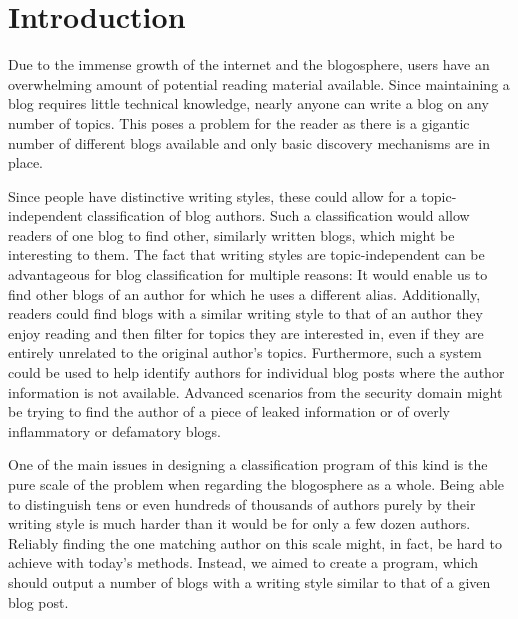 
\section{Introduction}
\label{sec:introduction}

Due to the immense growth of the internet and the blogosphere, users have an overwhelming amount of potential reading material available.
Since maintaining a blog requires little technical knowledge, nearly anyone can write a blog on any number of topics.
This poses a problem for the reader as there is a gigantic number of different blogs available and only basic discovery mechanisms are in place.


Since people have distinctive writing styles, these could allow for a topic-independent classification of blog authors.
Such a classification would allow readers of one blog to find other, similarly written blogs, which might be interesting to them.
The fact that writing styles are topic-independent can be advantageous for blog classification for multiple reasons: It would enable us to find other blogs of an author for which he uses a different alias.
Additionally, readers could find blogs with a similar writing style to that of an author they enjoy reading and then filter for topics they are interested in, even if they are entirely unrelated to the original author's topics.
Furthermore, such a system could be used to help identify authors for individual blog posts where the author information is not available.
Advanced scenarios from the security domain might be trying to find the author of a piece of leaked information or of overly inflammatory or defamatory blogs.


One of the main issues in designing a classification program of this kind is the pure scale of the problem when regarding the blogosphere as a whole.
Being able to distinguish tens or even hundreds of thousands of authors purely by their writing style is much harder than it would be for only a few dozen authors.
Reliably finding the one matching author on this scale might, in fact, be hard to achieve with today's methods.
Instead, we aimed to create a program, which should output a number of blogs with a writing style similar to that of a given blog post.

